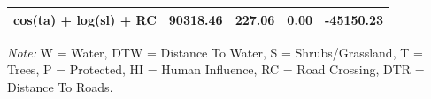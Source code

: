 \documentclass[abstract=off,10pt,a4paper,bibliography=totocnumbered]{article}
\begin{document}
\begin{table}[hbpt]
\begin{center}
{\begin{threeparttable}
\begin{tabular}{lllll}
          cos(ta) + log(sl) + RC & 90318.46 & 227.06 & 0.00 & -45150.23 \\
         \bottomrule
       \end{tabular}
       \begin{tablenotes}
         \item \textit{Note:} W = Water, DTW = Distance To Water, S =
         Shrubs/Grassland, T = Trees, P = Protected, HI = Human Influence, RC =
         Road Crossing, DTR = Distance To Roads.
       \end{tablenotes}
     \end{threeparttable}
    }
  \end{center}
\end{table}

\newpage
\begingroup
\singlespacing

\endgroup
\end{document}
